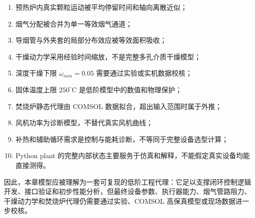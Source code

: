 \documentclass[UTF8,openany,zihao=-4,oneside]{ctexbook}
\begin{document}
\begin{enumerate}
\item 预热炉内真实颗粒运动被平均停留时间和轴向离散近似；
\item 烟气分配被合并为单一等效烟气通道；
\item 导烟管与外夹套的局部分布效应被等效面积吸收；
\item 干燥动力学采用经验时间缩放，不是完整多孔介质干燥模型；
\item 深度干燥下限 \(\omega_{min}=0.05\) 需要通过实验或实机数据校核；
\item 固体温度上限 \(250^\circ\mathrm{C}\) 是低阶模型中的数值和物理保护；
\item 焚烧炉静态代理由 COMSOL 数据拟合，超出输入范围时属于外推；
\item 风机功率为诊断模型，不替代真实风机曲线；
\item 补热和辅助循环需求是控制与能耗诊断，不等同于完整设备选型计算；
\item Python plant 的完整内部状态主要服务于仿真和解释，不能假定真实设备均能直接测得。
\end{enumerate}

因此，本章模型应被理解为一套可复现的低阶工程代理：它足以支撑闭环控制逻辑开发、接口验证和初步性能分析，但最终设备参数、执行器能力、烟气管路阻力、干燥动力学和焚烧炉代理仍需要通过实验、COMSOL 高保真模型或现场数据进一步校核。
\end{document}
